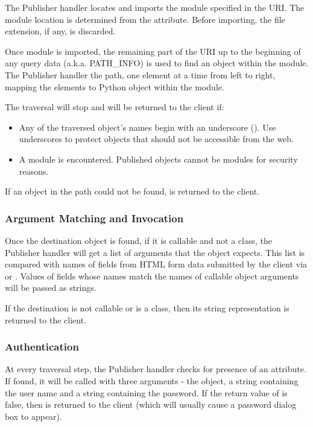 The Publisher handler locates and imports the module specified in the
URI. The module location is determined from the
 attribute. Before importing, the file extension, 
if any, is discarded.

Once module is imported, the remaining part of the URI up to the
beginning of any query data (a.k.a. PATH_INFO) is used to find an
object within the module. The Publisher handler  the 
path, one element at a time from left to right, mapping the elements
to Python object within the module.

The traversal will stop and  will be returned to
the client if:

\begin{itemize}

\item
Any of the traversed object's names begin with an underscore
(\samp{\_}). Use underscores to protect objects that should not be
accessible from the web.

\item
A module is encountered. Published objects cannot be modules for
security reasons.

\end{itemize}

If an object in the path could not be found, 
is returned to the client.

\subsubsection{Argument Matching and Invocation\label{hand-pub-alg-args}}

Once the destination object is found, if it is callable and not a
class, the Publisher handler will get a list of arguments that the
object expects. This list is compared with names of fields from HTML
form data submitted by the client via  or
. Values of fields whose names match the names of callable
object arguments will be passed as strings.

If the destination is not callable or is a class, then its string
representation is returned to the client.

\subsubsection{Authentication\label{hand-pub-alg-auth}}

At every traversal step, the Publisher handler checks for presence of
an  attribute. If found, it will be called with three
arguments - the  object, a string containing the user
name and a string containing the password. If the return value of
 is false, then  is
returned to the client (which will usually cause a password dialog box
to appear).

